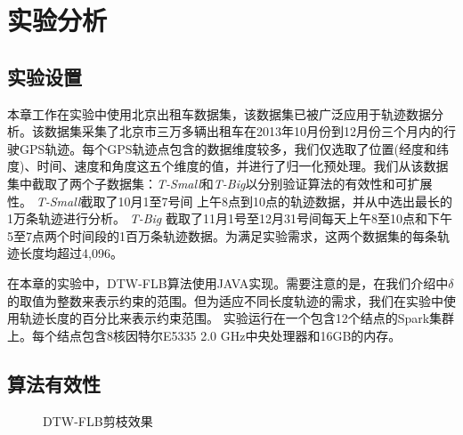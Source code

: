  
 
  \section{实验分析}\label{sec-c5-Exp}
  \subsection{实验设置}
  本章工作在实验中使用北京出租车数据集，该数据集已被广泛应用于轨迹数据分析。该数据集采集了北京市三万多辆出租车在2013年10月份到12月份三个月内的行驶GPS轨迹。每个GPS轨迹点包含的数据维度较多，我们仅选取了位置(经度和纬度)、时间、速度和角度这五个维度的值，并进行了归一化预处理。我们从该数据集中截取了两个子数据集：\emph{T-Small}和\emph{T-Big}以分别验证算法的有效性和可扩展性。
  \emph{T-Small}截取了10月1至7号间 上午8点到10点的轨迹数据，并从中选出最长的1万条轨迹进行分析。
  \emph{T-Big} 截取了11月1号至12月31号间每天上午8至10点和下午5至7点两个时间段的1百万条轨迹数据。为满足实验需求，这两个数据集的每条轨迹长度均超过4,096。
  
  在本章的实验中，DTW-FLB算法使用JAVA实现。需要注意的是，在我们介绍中$\delta$的取值为整数来表示约束的范围。但为适应不同长度轨迹的需求，我们在实验中使用轨迹长度的百分比来表示约束范围。
  实验运行在一个包含12个结点的Spark集群上。每个结点包含8核因特尔E5335 2.0 GHz中央处理器和16GB的内存。
  
  \subsection{算法有效性} 
  \begin{figure}
  	\centering
  		\centering
  		\caption{DTW-FLB剪枝效果}
  		\label{fig:hpaaPruning}
  \end{figure}



